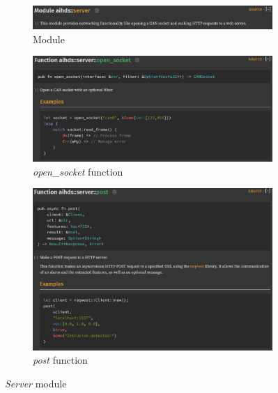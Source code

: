 \begin{figure}
    \centering
    \begin{subfigure}[b]{\linewidth}
        \includegraphics[width = \linewidth]{img/parts/docs/server/server.png}
        \caption{Module}
        \label{subfig:doc_server}
    \end{subfigure}
    \begin{subfigure}[b]{\linewidth}
        \includegraphics[width = \linewidth]{img/parts/docs/server/server_opensocket.png}
        \caption{\emph{open\_socket} function}
        \label{subfig:doc_server_opensocket}
    \end{subfigure}
    \begin{subfigure}[b]{\linewidth}
        \includegraphics[width = \linewidth]{img/parts/docs/server/server_post.png}
        \caption{\emph{post} function}
        \label{subfig:doc_server_post}
    \end{subfigure}
    \caption{\emph{Server} module}
    \label{fig:doc_server}
\end{figure}